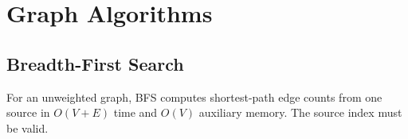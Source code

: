 \section{Graph Algorithms}

\subsection{Breadth-First Search}

For an unweighted graph, BFS computes shortest-path edge counts from one source in
$O(V+E)$ time and $O(V)$ auxiliary memory. The source index must be valid.


